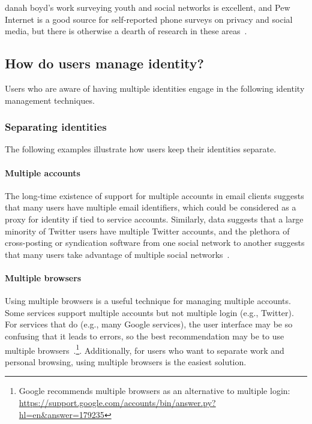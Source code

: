 \documentclass[10pt, conference, compsocconf]{IEEEtran}
\begin{document}
danah boyd's work surveying youth and social networks is excellent, and Pew
Internet is a good source for self-reported phone surveys on privacy and social
media, but there is otherwise a dearth of research in these
areas~\cite{boyd,pew1,pew2,pew3}.

\subsection{How do users manage identity?}

Users who are aware of having multiple identities engage in the following
identity management techniques.

\subsubsection{Separating identities}

The following examples illustrate how users keep their identities separate.

\paragraph{Multiple accounts}
The long-time existence of support for multiple accounts in email clients
suggests that many users have multiple email identifiers, which could be
considered as a proxy for identity if tied to service accounts. Similarly, data
suggests that a large minority of Twitter users have multiple Twitter accounts,
and the plethora of cross-posting or syndication software from one social
network to another suggests that many users take advantage of multiple social
networks~\cite{twitter}.

\paragraph{Multiple browsers}

Using multiple browsers is a useful technique for managing multiple accounts.
Some services support multiple accounts but not multiple login (e.g.,
Twitter). For services that do (e.g., many Google services), the user interface
may be so confusing that it leads to errors, so the best recommendation may be
to use multiple browsers~\cite{yegge}.\footnote{Google recommends multiple
browsers as an alternative to multiple login:
\url{https://support.google.com/accounts/bin/answer.py?hl=en&answer=179235}}.
Additionally, for users who want to separate work and
personal browsing, using multiple browsers is the easiest solution.
\end{document}
